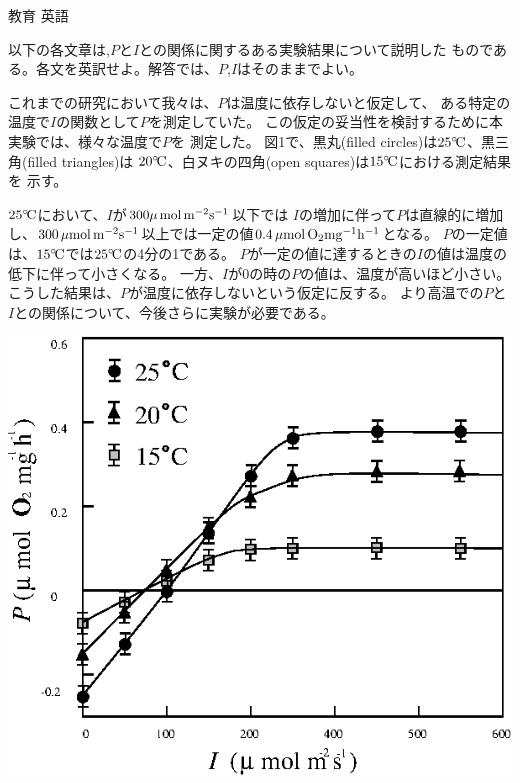 \documentclass[fleqn]{jbook}
\begin{document}
\begin{question}{教育 英語}{}
\begin{subquestions}
\SubQuestion
  以下の各文章は,$P$と$I$との関係に関するある実験結果について説明した
  ものである。各文を英訳せよ。解答では、$P$,$I$はそのままでよい。
%
  \begin{subsubquestions}%
  \SubSubQuestion
    これまでの研究において我々は、$P$は温度に依存しないと仮定して、
    ある特定の温度で$I$の関数として$P$を測定していた。
  \SubSubQuestion
    この仮定の妥当性を検討するために本実験では、様々な温度で$P$を
    測定した。
  \SubSubQuestion
    図1で、黒丸(filled circles)は$25^{\circ}\!\rm C$、黒三角(filled triangles)は
    $20^{\circ}\!\rm C$、白ヌキの四角(open squares)は$15^{\circ}\!\rm C$における測定結果を
    示す。\\
  \parbox[t]{80mm}{
  \SubSubQuestion
    $ 25^{\circ}\!\rm C $において、$I$が$300\mu\,{\rm mol\,m^{-2}s^{-1}}$以下では $I$の増加に伴って$P$は直線的に増加し、$300\,{\rm \mu mol\,m^{-2}s^{-1}}$以上では一定の値$0.4\,{\rm \mu mol\,O_2 mg^{-1}h^{-1}}$となる。
  \SubSubQuestion
    $P$の一定値は、$15^{\circ}\!\rm C$では$25^{\circ}\!\rm C$の4分の1である。
  \SubSubQuestion
    $P$が一定の値に達するときの$I$の値は温度の低下に伴って小さくなる。
  \SubSubQuestion
    一方、$I$が0の時の$P$の値は、温度が高いほど小さい。
  \SubSubQuestion
    こうした結果は、$P$が温度に依存しないという仮定に反する。
  \SubSubQuestion
    より高温での$P$と$I$との関係について、今後さらに実験が必要である。
  }\parbox[t]{80mm}{
  \begin{center}
    \mbox{\includegraphics[clip]{1995engl-1.eps}}
  \end{center}}
  \end{subsubquestions}


\end{subquestions}
\end{question}
\end{document}
